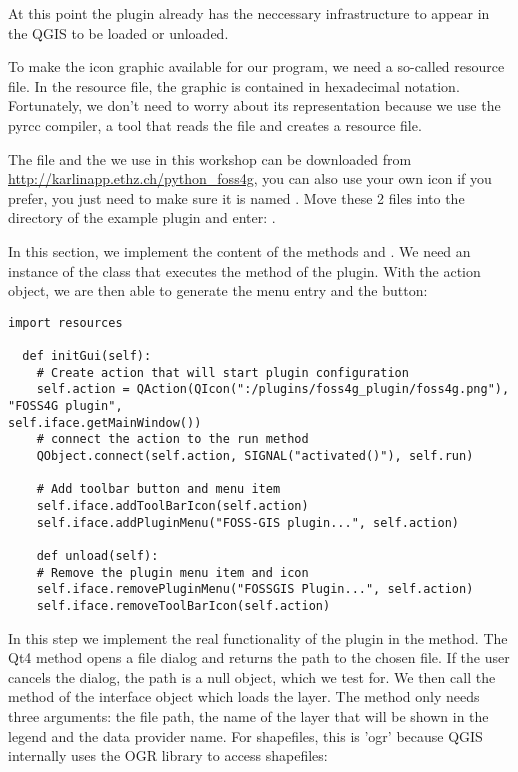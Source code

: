 At this point the plugin already has the neccessary infrastructure to appear in
the QGIS  to be
loaded or unloaded. 


To make the icon graphic available for our program, we need a so-called
resource file. In the resource file, the graphic is contained in hexadecimal
notation. Fortunately, we don't need to worry about its representation because
we use the pyrcc compiler, a tool that reads the file
 and creates a resource file. 

The file  and the  we use in
this workshop can be downloaded from \url{http://karlinapp.ethz.ch/python\_foss4g}, you 
can also use your own icon if you prefer, you just need to make sure it is named 
. Move these 2 files into the directory of the example plugin 
 and enter: .


In this section, we implement the content of the methods  and
. We need an instance of the class  that executes the
 method of the plugin. With the action object, we are then able to
generate the menu entry and the button:

\begin{verbatim}
import resources

  def initGui(self):
    # Create action that will start plugin configuration
    self.action = QAction(QIcon(":/plugins/foss4g_plugin/foss4g.png"), "FOSS4G plugin",
self.iface.getMainWindow())
    # connect the action to the run method
    QObject.connect(self.action, SIGNAL("activated()"), self.run)

    # Add toolbar button and menu item
    self.iface.addToolBarIcon(self.action)
    self.iface.addPluginMenu("FOSS-GIS plugin...", self.action)

    def unload(self):
    # Remove the plugin menu item and icon
    self.iface.removePluginMenu("FOSSGIS Plugin...", self.action)
    self.iface.removeToolBarIcon(self.action)
\end{verbatim}


In this step we implement the real functionality of the plugin in the
 method. The Qt4 method 
opens a file dialog and returns the path to the chosen file. If the user
cancels the dialog, the path is a null object, which we test for. We then
call the method  of the interface object which loads
the layer. The method only needs three arguments: the file path, the name of
the layer that will be shown in the legend and the data provider name. For
shapefiles, this is 'ogr' because QGIS internally uses the OGR library to
access shapefiles:

